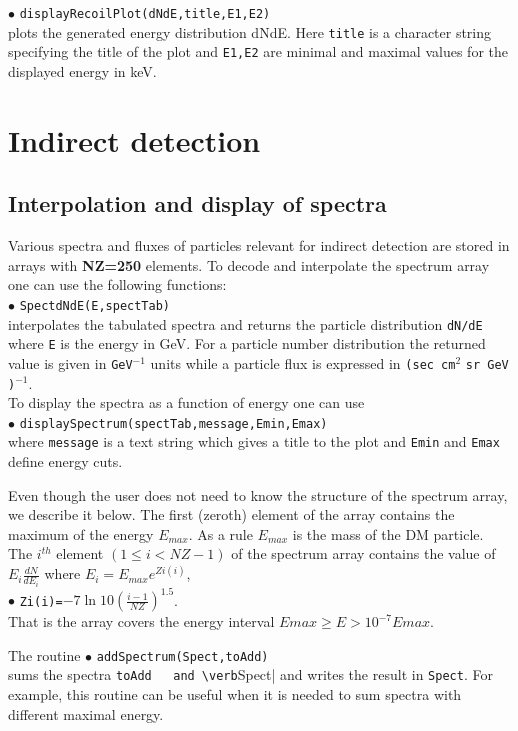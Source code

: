 \documentclass[12pt,a4paper]{article}
\begin{document}
\noindent
$\bullet$ \verb|displayRecoilPlot(dNdE,title,E1,E2)|\\
plots the  generated energy distribution dNdE. Here \verb|title|
is a character string specifying the title of the plot and
\verb|E1,E2| are minimal and maximal values for the displayed
energy in keV.

\section{Indirect detection}




\subsection{Interpolation and display of spectra}
Various spectra and fluxes  of particles  relevant for indirect detection are stored in
arrays with {\bf NZ=250} elements. To decode and interpolate the spectrum array
one can use the following functions:\\
$\bullet$  \verb|SpectdNdE(E,spectTab)|\\
interpolates the tabulated spectra  and returns the 
particle distribution \verb|dN/dE|  where \verb|E| is the energy  in GeV. 
For a particle number  distribution the returned value is given in \verb|GeV|$^{-1}$
units while  a particle flux is expressed in \verb|(sec cm|$^2$ \verb|sr GeV )|$^{-1}$.\\
To display the  spectra  as a function of energy one can use \\
$\bullet$ \verb|displaySpectrum(spectTab,message,Emin,Emax)|\\
where  \verb|message| is a text string which gives a title to the  
plot and  \verb|Emin| and \verb|Emax| define  energy cuts.

Even though the user does not need to know the structure of the  spectrum array, we describe it below.
The first (zeroth) element of the array contains the maximum of the energy $E_{max}$. As a rule   $E_{max}$ is the mass of the DM particle.    
The $i^{th}$ element $(1\le i < NZ-1)$ of the spectrum array contains
the value of $E_i \frac{ dN}{dE_i} $ where  $E_i=E_{max} e^{Zi(i)}$,\\   
$\bullet$ \verb|Zi(i)=|$ -7 \ln 10 \left(\frac{i-1}{NZ}\right)^{1.5}$.\\
 That is the array  covers the  energy interval  $ Emax \ge E > 10^{-7}Emax$. 

The routine 
$\bullet$ \verb|addSpectrum(Spect,toAdd)|\\
sums the  spectra \verb|toAdd   and \verb|Spect| and writes the result in \verb|Spect|. For example, this routine can be useful when it is needed to sum spectra 
with different  maximal energy.
\end{document}
